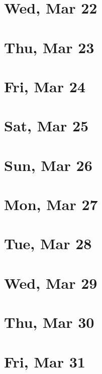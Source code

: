 	\section{Wed, Mar 22}
		
	\section{Thu, Mar 23}
		
	\section{Fri, Mar 24}
		
	\section{Sat, Mar 25}
		
	\section{Sun, Mar 26}
		
	\section{Mon, Mar 27}
		
	\section{Tue, Mar 28}
		
	\section{Wed, Mar 29}
		
	\section{Thu, Mar 30}
		
	\section{Fri, Mar 31}
		
